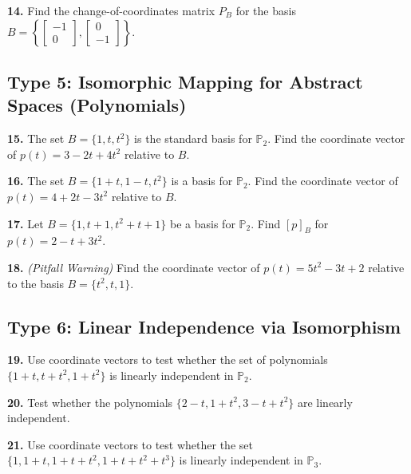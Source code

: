 \documentclass{article}
\begin{document}
\vspace{0.2cm}
\textbf{14.} Find the change-of-coordinates matrix $P_B$ for the basis $B = \left\{ \begin{bmatrix} -1 \\ 0 \end{bmatrix}, \begin{bmatrix} 0 \\ -1 \end{bmatrix} \right\}$.

\subsection*{Type 5: Isomorphic Mapping for Abstract Spaces (Polynomials)}
\textbf{15.} The set $B = \{1, t, t^2\}$ is the standard basis for $\mathbb{P}_2$. Find the coordinate vector of $p(t) = 3 - 2t + 4t^2$ relative to $B$.

\vspace{0.2cm}
\textbf{16.} The set $B = \{1+t, 1-t, t^2\}$ is a basis for $\mathbb{P}_2$. Find the coordinate vector of $p(t) = 4 + 2t - 3t^2$ relative to $B$.

\vspace{0.2cm}
\textbf{17.} Let $B = \{1, t+1, t^2+t+1\}$ be a basis for $\mathbb{P}_2$. Find $[p]_B$ for $p(t) = 2 - t + 3t^2$.

\vspace{0.2cm}
\textbf{18.} \textit{(Pitfall Warning)} Find the coordinate vector of $p(t) = 5t^2 - 3t + 2$ relative to the basis $B = \{t^2, t, 1\}$.

\subsection*{Type 6: Linear Independence via Isomorphism}
\textbf{19.} Use coordinate vectors to test whether the set of polynomials $\{1+t, t+t^2, 1+t^2\}$ is linearly independent in $\mathbb{P}_2$.

\vspace{0.2cm}
\textbf{20.} Test whether the polynomials $\{2-t, 1+t^2, 3-t+t^2\}$ are linearly independent.

\vspace{0.2cm}
\textbf{21.} Use coordinate vectors to test whether the set $\{1, 1+t, 1+t+t^2, 1+t+t^2+t^3\}$ is linearly independent in $\mathbb{P}_3$.
\end{document}
